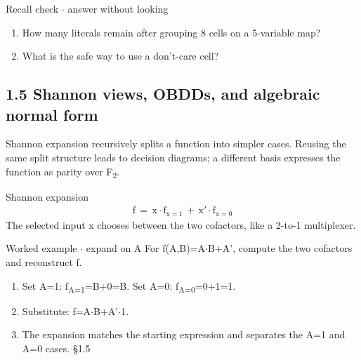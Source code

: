 \documentclass[11pt]{article}
\begin{document}
\begin{keepsection}
\begin{recallbox}{Recall check \ensuremath{\cdot} answer without looking}
\begin{enumerate}
\item How many literals remain after grouping 8 cells on a 5-variable map?
\item What is the safe way to use a don’t-care cell?
\end{enumerate}

\end{recallbox}
\end{keepsection}

\begin{keepsection}
\section{1.5 Shannon views, OBDDs, and algebraic normal form}

Shannon expansion recursively splits a function into simpler cases. Reusing the same split structure leads to decision diagrams; a different basis expresses the function as parity over F\textsubscript{2}.

\begin{equationcard}{Shannon expansion}
\[ \begin{gathered} \mathrm{f}\, =\, \mathrm{x}\cdot \mathrm{f}_{\mathrm{x}=1}\, +\, \mathrm{x}'\cdot \mathrm{f}_{\mathrm{x}=0} \end{gathered} \]
{\small The selected input x chooses between the two cofactors, like a 2-to-1 multiplexer.}
\end{equationcard}

\begin{workedbox}{Worked example \ensuremath{\cdot} expand on A}
For f(A,B)=A\ensuremath{\cdot}B+A', compute the two cofactors and reconstruct f.

\begin{enumerate}
\item Set A=1: f\textsubscript{A=1}=B+0=B. Set A=0: f\textsubscript{A=0}=0+1=1.
\item Substitute: f=A\ensuremath{\cdot}B+A'\ensuremath{\cdot}1.
\item The expansion matches the starting expression and separates the A=1 and A=0 cases. \hfill{\small\color{FAUblue}§1.5}
\end{enumerate}
\end{workedbox}


\end{keepsection}
\end{document}
